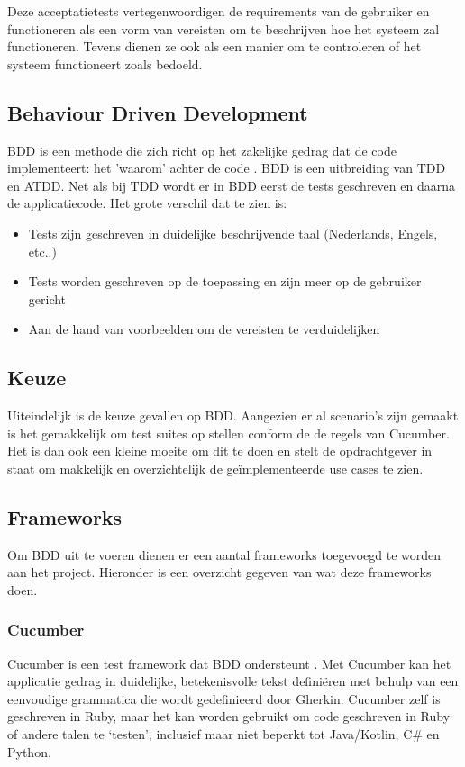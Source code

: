 Deze acceptatietests vertegenwoordigen de requirements van de gebruiker en functioneren als een vorm van vereisten om te beschrijven hoe het systeem zal functioneren. Tevens dienen ze ook als een manier om te controleren of het systeem functioneert zoals bedoeld. 

\subsection{Behaviour Driven Development}
\acrshort{BDD} is een methode die zich richt op het zakelijke gedrag dat de code implementeert: het 'waarom' achter de code \citep{wynne2017cucumber}. \acrshort{BDD} is een uitbreiding van \acrshort{TDD} en \acrshort{ATDD}. Net als bij \acrshort{TDD} wordt er in \acrshort{BDD} eerst de tests geschreven en daarna de applicatiecode. Het grote verschil dat te zien is:

\begin{itemize}[noitemsep]
    \item Tests zijn geschreven in duidelijke beschrijvende taal (Nederlands, Engels, etc..)
    \item Tests worden geschreven op de toepassing en zijn meer op de gebruiker gericht
    \item Aan de hand van voorbeelden om de vereisten te verduidelijken
\end{itemize}

\subsection{Keuze}

Uiteindelijk is de keuze gevallen op \acrshort{BDD}. Aangezien er al scenario's zijn gemaakt is het gemakkelijk om test suites op stellen conform de de regels van Cucumber. Het is dan ook een kleine moeite om dit te doen en stelt de opdrachtgever in staat om makkelijk en overzichtelijk de geïmplementeerde use cases te zien.

\subsection{Frameworks}

Om \acrshort{BDD} uit te voeren dienen er een aantal frameworks toegevoegd te worden aan het project. Hieronder is een overzicht gegeven van wat deze frameworks doen.

\subsubsection{Cucumber}
Cucumber is een test framework dat BDD ondersteunt \citep{wynne2017cucumber}. Met Cucumber kan het applicatie gedrag in duidelijke, betekenisvolle tekst definiëren met behulp van een eenvoudige grammatica die wordt gedefinieerd door Gherkin. Cucumber zelf is geschreven in Ruby, maar het kan worden gebruikt om code geschreven in Ruby of andere talen te `testen', inclusief maar niet beperkt tot Java/Kotlin, C\# en Python.

